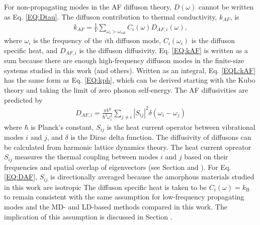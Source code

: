 \documentclass[aps,prb,onecolumn,preprint,superscriptaddress,footinbib,amsmath,amssymb,floatfix]{revtex4}
\begin{document}
For non-propagating modes in the AF diffuson theory, 
$D(\omega)$ cannot be written as Eq. \eqref{EQ:Dtau}.\cite{allen_thermal_1993}  
The diffuson contribution to thermal conductivity, $k_{AF}$, is
\cite{feldman_thermal_1993,feldman_numerical_1999}
\begin{equation}\label{EQ:kAF}
\begin{split}
k_{AF} = \frac{1}{V}\sum_{\omega_i>\omega_{cut}} C_i(\omega) D_{AF,i}(\omega), 
\end{split}
\end{equation}
where $\omega_i$ is the frequency of the $i$th diffuson mode, $C_i(\omega_i)$ 
is the diffuson specific heat, and $D_{AF,i}$ is the diffuson diffusivity.
Eq. \eqref{EQ:kAF} is written as a sum because there are enough high-frequency 
diffuson modes in the finite-size systems studied in this work (and others).
\cite{feldman_thermal_1993,feldman_numerical_1999} 
Written as an integral, Eq. \eqref{EQL:kAF} has the same form as 
Eq. \ref{EQ:kph}, which can be derived starting 
with the Kubo theory
\cite{flicker_lattice_1973,allen_thermal_1993,alam_lattice_2005,
baldi_thermal_2008,yang_anomalously_2010}  
and taking the limit 
of zero phonon self-energy.\cite{baldi_thermal_2008} 
The AF diffusivities are predicted by\cite{allen_thermal_1993} 
\begin{equation}\label{EQ:DAF}
\begin{split}
D_{AF,i} = \frac{\pi V^2}{\hbar^2\omega^2_i}\sum_{j\neq i}
|S_{ij}|^2 \delta(\omega_i - \omega_j)
\end{split}
\end{equation}
where $\hbar$ is Planck's constant, $S_{ij}$ is the heat current operator 
between vibrational modes $i$ and $j$, and $\delta$ is the Dirac delta 
function. The diffusivity of diffusons 
can be calculated from harmonic lattice dynamics theory.
\cite{allen_thermal_1993,feldman_thermal_1993,feldman_numerical_1999} 
The heat current opreator $S_{ij}$ measures the thermal 
coupling between modes $i$ and $j$ based on their frequencies and 
spatial overlap of eigenvectors (see Section and ). 
For Eq. \eqref{EQ:DAF}, $S_{ij}$ is directionally averaged because 
the amorphous materials studied in this work are isotropic
The diffuson specific heat is taken to be $C_i(\omega) = k_{\text{B}}$ 
to remain consistent with the same assumption for low-frequency propagating 
modes and the MD- and LD-based methods compared in this work. The implication 
of this assumption is discussed in Section .

\end{document}
